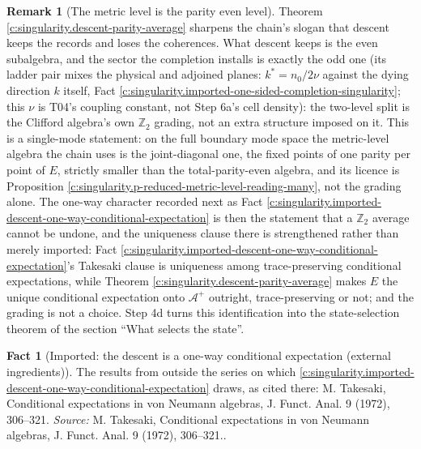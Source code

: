 \documentclass[11pt]{article}
\theoremstyle{definition}
\newtheorem{fact}[theorem]{Fact}
\newtheorem{remark}[theorem]{Remark}
\theoremstyle{plain}
\providecommand{\Aev}{}\renewcommand{\Aev}{\mathcal{A}^{+}}
\providecommand{\nO}{}\renewcommand{\nO}{n_0}
\begin{document}
\begin{remark}[The metric level is the parity even level]\label{c:note.singularity.metric-level-parity-even-level}
Theorem \ref{c:singularity.descent-parity-average} sharpens the chain's slogan that descent keeps the records and loses the coherences. What descent keeps is the even subalgebra, and the sector the completion installs is exactly the odd one (its ladder pair mixes the physical and adjoined planes: $k^{*} = \nO/2\nu$ against the dying direction $k$ itself, Fact \ref{c:singularity.imported-one-sided-completion-singularity}; this $\nu$ is T04's coupling constant, not Step 6a's cell density): the two-level split is the Clifford algebra's own $\mathbb{Z}_2$ grading, not an extra structure imposed on it. This is a single-mode statement: on the full boundary mode space the metric-level algebra the chain uses is the joint-diagonal one, the fixed points of one parity per point of $E$, strictly smaller than the total-parity-even algebra, and its licence is Proposition \ref{c:singularity.p-reduced-metric-level-reading-many}, not the grading alone. The one-way character recorded next as Fact \ref{c:singularity.imported-descent-one-way-conditional-expectation} is then the statement that a $\mathbb{Z}_2$ average cannot be undone, and the uniqueness clause there is strengthened rather than merely imported: Fact \ref{c:singularity.imported-descent-one-way-conditional-expectation}'s Takesaki clause is uniqueness among trace-preserving conditional expectations, while Theorem \ref{c:singularity.descent-parity-average} makes $E$ the unique conditional expectation onto $\Aev$ outright, trace-preserving or not; and the grading is not a choice. Step 4d turns this identification into the state-selection theorem of the section ``What selects the state''.
\end{remark}

\begin{fact}[Imported: the descent is a one-way conditional expectation (external ingredients)]\label{c:singularity.imported-descent-one-way-conditional-expectation-external}
The results from outside the series on which \ref{c:singularity.imported-descent-one-way-conditional-expectation} draws, as cited there: M. Takesaki, Conditional expectations in von Neumann algebras, J. Funct. Anal. 9 (1972), 306--321.
\emph{Source:} M. Takesaki, Conditional expectations in von Neumann algebras, J. Funct. Anal. 9 (1972), 306--321..
\end{fact}
\end{document}
